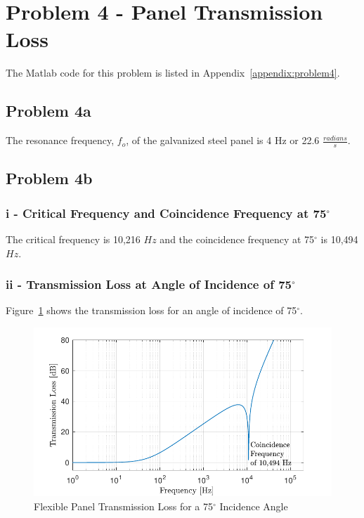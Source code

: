 {\newpage
\section*{Problem 4 - Panel Transmission Loss}

The Matlab code for this problem is listed in Appendix~\ref{appendix:problem4}.

\subsection*{Problem 4a}

The resonance frequency, $f_o$, of the galvanized steel panel is 4 Hz or 22.6 $\frac{radians}{s}$.


\subsection*{Problem 4b}


\vspace{0.25cm}
\subsubsection*{i - Critical Frequency and Coincidence Frequency at 75$^\circ$}

The critical frequency is 10,216 $Hz$ and the coincidence frequency at 75$^\circ$ is 10,494 $Hz$.



\vspace{0.25cm}
\subsubsection*{ii - Transmission Loss at Angle of Incidence of 75$^\circ$}

Figure~\ref{figure:q4transmissionLossAt75} shows the transmission loss for an angle of incidence of 75$^\circ$.

\begin{figure}[htbp]
    \center
    \includegraphics[scale=0.9]{Q4 TL for 75 AOI.pdf}
    \vspace{0.25cm}
    \caption{Flexible Panel Transmission Loss for a 75$^\circ$ Incidence Angle}
    \label{figure:q4transmissionLossAt75}
\end{figure}



}
